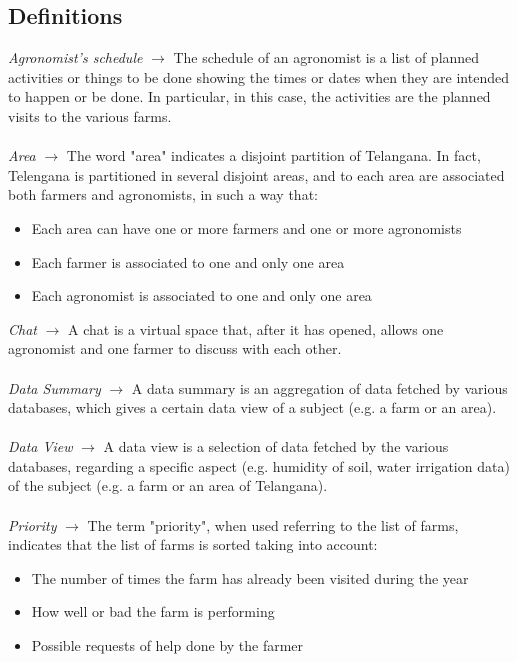 \documentclass[10pt]{report}
\begin{document}
    \subsection{Definitions}
    \emph{Agronomist's schedule} $\rightarrow$ The schedule of an agronomist is a list of planned activities or things to be done showing the times or dates when they are intended to happen or be done. In particular, in this case, the activities are the planned visits to the various farms.
    \\ \\
    \emph{Area} $\rightarrow$ The word "area" indicates a disjoint partition of Telangana. In fact, Telengana is partitioned in several disjoint areas, and to each area are associated both farmers and agronomists, in such a way that:
    \begin{itemize}
        \item Each area can have one or more farmers and one or more agronomists
        \item Each farmer is associated to one and only one area
        \item Each agronomist is associated to one and only one area
    \end{itemize}
    \emph{Chat} $\rightarrow$ A chat is a virtual space that, after it has opened, allows one agronomist and one farmer to discuss with each other.
    \\ \\
    \emph{Data Summary} $\rightarrow$ A data summary is an aggregation of data fetched by various databases, which gives a certain data view of a subject (e.g. a farm or an area).
    \\ \\
    \emph{Data View} $\rightarrow$ A data view is a selection of data fetched by the various databases, regarding a specific aspect (e.g. humidity of soil, water irrigation data) of the subject (e.g. a farm or an area of Telangana).
    \\ \\
    \emph{Priority} $\rightarrow$ The term "priority", when used referring to the list of farms, indicates that the list of farms is sorted taking into account:
    \begin{itemize}
        \item The number of times the farm has already been visited during the year
        \item How well or bad the farm is performing
        \item Possible requests of help done by the farmer
    \end{itemize}
\end{document}
